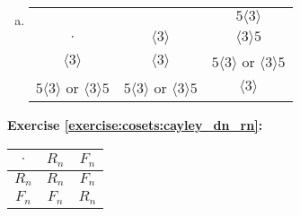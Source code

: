 \begin{enumerate}[(a)]
\item
\begin{center}
\begin{tabular}{c|cc}
                         & & $5 \langle 3 \rangle$ \\
$\cdot$             & $\langle 3\rangle$ & $\langle 3 \rangle 5$ \\\hline
$\langle 3\rangle$ & $\langle 3 \rangle$ & $5 \langle 3 \rangle$ or $\langle 3 \rangle 5$ \\
$5 \langle 3 \rangle$ or $\langle 3 \rangle 5$ & $5 \langle 3 \rangle$ or $\langle 3 \rangle 5$ & $\langle 3\rangle$\\

\end{tabular}
\end{center}
\end{enumerate}

\noindent\textbf{Exercise \ref{exercise:cosets:cayley_dn_rn}:}
\begin{center}
\begin{tabular}{c|cc}
$\cdot$             & $R_n$ & $F_n$ \\\hline
$R_n$ & $R_n$ & $F_n$ \\
$F_n$ & $F_n$ & $R_n$\\

\end{tabular}
\end{center}

